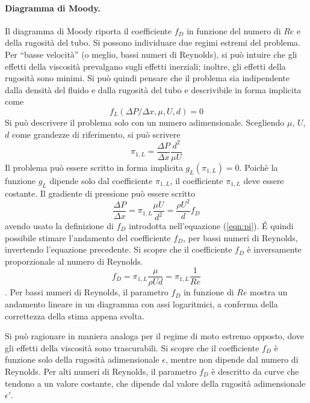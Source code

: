 \paragraph{Diagramma di Moody.} Il diagramma di Moody riporta il 
 coefficiente $f_D$ in funzione del numero di $Re$ e della rugosità
 del tubo.
 Si possono individuare due regimi estremi del problema. Per ``basse
  velocità'' (o meglio, bassi numeri di Reynolds), si può intuire che gli
  effetti  della viscosità prevalgano sugli effetti inerziali; inoltre, gli
  effetti della rugosità sono minimi.
  Si può quindi pensare che il problema sia indipendente dalla densità
  del fluido e dalla rugosità del tubo e descrivibile in forma implicita 
  come
  \begin{equation}
    f_L (\Delta P / \Delta x, \mu, U, d) = 0
  \end{equation}
  Si può descrivere il problema solo con un numero adimensionale. Scegliendo
  $\mu$, $U$, $d$ come grandezze di riferimento, si può scrivere
  \begin{equation}
   \pi_{1,L} = \dfrac{\Delta P}{\Delta x} \dfrac{d^2}{\mu U}
  \end{equation}
  Il problema può essere scritto in forma implicita $g_L(\pi_{1,L}) = 0$. 
  Poichè la funzione $g_L$ dipende solo dal coefficiente $\pi_{1,L}$, il
  coefficiente $\pi_{1,L}$ deve essere costante. Il gradiente di pressione
  può essere scritto 
  \begin{equation}
    \dfrac{\Delta P}{\Delta x} = \pi_{1,L} \dfrac{\mu U}{d^2} = 
      \dfrac{\rho U^2}{d} f_D
  \end{equation}
  avendo usato la definizione di $f_D$ introdotta nell'equazione
  (\ref{eqn:pi}). \'E quindi possibile stimare l'andamento del coefficiente
  $f_D$, per bassi numeri di Reynolds, invertendo l'equazione precedente. Si
  scopre che il coefficiente $f_D$ è inversamente proporzionale al numero 
  di Reynolds.
  \begin{equation}
   f_D = \pi_{1,L} \dfrac{\mu}{\rho U d} = \pi_{1,L} \dfrac{1}{Re}
  \end{equation}.
  Per bassi numeri di Reynolds, il parametro $f_D$ in funzione di $Re$
  mostra un andamento lineare in un diagramma con assi logaritmici, a
  conferma della correttezza della stima appena svolta.
  
  Si può ragionare in maniera analoga per il regime di moto estremo opposto,
  dove gli effetti della viscosità sono trascurabili. Si scopre
  che il coefficiente $f_D$ è funzione solo della rugosità adimensionale
  $\epsilon$, mentre non dipende dal numero di Reynolds.
  Per alti numeri di Reynolds, il parametro $f_D$ è descritto da curve che
  tendono a un valore costante, che dipende dal valore della rugosità
  adimensionale $\epsilon'$.

